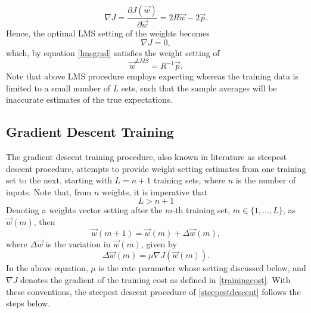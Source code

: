 \documentclass[%
    corpo=11pt,
    twoside,
    stile=classica,
    oldstyle,
    autoretitolo,
    tipotesi=magistrale,
    greek,
    evenboxes,
    english
]{toptesi}
\begin{document}
\begin{equation}
\label{lmsgrad}
\nabla J = \frac{\partial J(\vec{w})}{\partial \vec{w}} = 2R\vec{w} - 2\vec{p}.
\end{equation}
Hence, the optimal LMS setting of the weights becomes
\begin{equation}
\nabla J = 0,
\end{equation}
which, by equation \eqref{lmsgrad} satisfies the weight setting of 
\begin{equation}
\vec{w}^{LMS} = R^{-1}\vec{p}.
\end{equation}
Note that above LMS procedure employs expecting whereas the training data is limited to a small number of $L$ sets, such that the sample averages will be inaccurate estimates of the true expectations. 

\subsection{Gradient Descent Training}
The gradient descent training procedure, also known in literature as steepest descent procedure, attempts to provide weight-setting estimates from one training set to the next, starting with $L=n+1$ training sets, where $n$ is the number of inputs. Note that, from $n$ weights, it is imperative that 
\begin{equation}
L > n + 1
\end{equation}
Denoting a weights vector setting after the $m$-th training set, $m \in \{1, \dots, L\}$, as $\vec{w}(m)$, then 
\begin{equation}
\label{steepestdescent}
\vec{w}(m+1) = \vec{w}(m) + \Delta\vec{w}(m),
\end{equation}
where $\Delta\vec{w}$ is the variation in $\vec{w}(m)$, given by
\begin{equation}
\label{variation}
\Delta\vec{w}(m) = \mu \nabla J\left(\vec{w}(m)\right).
\end{equation}
In the above equation, $\mu$ is the rate parameter whose setting discussed below, and $\nabla J$ denotes the gradient of the training cost as defined in \eqref{trainingcost}. With these conventions, the steepest descent procedure of \eqref{steepestdescent} follows the steps below.
\end{document}
